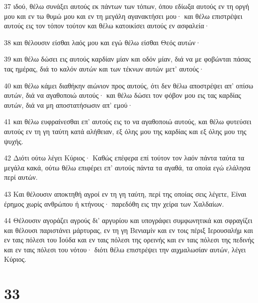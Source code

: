 \par 37 ιδού, θέλω συνάξει αυτούς εκ πάντων των τόπων, όπου εδίωξα αυτούς εν τη οργή μου και εν τω θυμώ μου και εν τη μεγάλη αγανακτήσει μου· και θέλω επιστρέψει αυτούς εις τον τόπον τούτον και θέλω κατοικίσει αυτούς εν ασφαλεία·
\par 38 και θέλουσιν είσθαι λαός μου και εγώ θέλω είσθαι Θεός αυτών·
\par 39 και θέλω δώσει εις αυτούς καρδίαν μίαν και οδόν μίαν, διά να με φοβώνται πάσας τας ημέρας, διά το καλόν αυτών και των τέκνων αυτών μετ' αυτούς·
\par 40 και θέλω κάμει διαθήκην αιώνιον προς αυτούς, ότι δεν θέλω αποστρέψει απ' οπίσω αυτών, διά να αγαθοποιώ αυτούς· και θέλω δώσει τον φόβον μου εις τας καρδίας αυτών, διά να μη αποστατήσωσιν απ' εμού·
\par 41 και θέλω ευφραίνεσθαι επ' αυτούς εις το να αγαθοποιώ αυτούς, και θέλω φυτεύσει αυτούς εν τη γη ταύτη κατά αλήθειαν, εξ όλης μου της καρδίας και εξ όλης μου της ψυχής.
\par 42 Διότι ούτω λέγει Κύριος· Καθώς επέφερα επί τούτον τον λαόν πάντα ταύτα τα μεγάλα κακά, ούτω θέλω επιφέρει επ' αυτούς πάντα τα αγαθά, τα οποία εγώ ελάλησα περί αυτών.
\par 43 Και θέλουσιν αποκτηθή αγροί εν τη γη ταύτη, περί της οποίας σεις λέγετε, Είναι έρημος χωρίς ανθρώπου ή κτήνους· παρεδόθη εις την χείρα των Χαλδαίων.
\par 44 Θέλουσιν αγοράζει αγρούς δι' αργυρίου και υπογράφει συμφωνητικά και σφραγίζει και θέλουσι παριστάνει μάρτυρας, εν τη γη Βενιαμίν και εν τοις πέριξ Ιερουσαλήμ και εν ταις πόλεσι του Ιούδα και εν ταις πόλεσι της ορεινής και εν ταις πόλεσι της πεδινής και εν ταις πόλεσι του νότου· διότι θέλω επιστρέψει την αιχμαλωσίαν αυτών, λέγει Κύριος.

\chapter{33}

